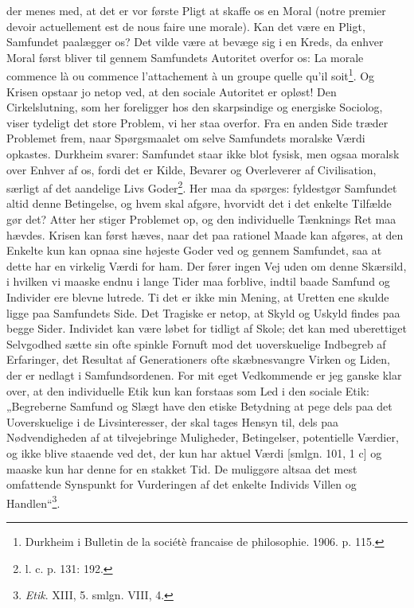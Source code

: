 \documentclass[12pt,a4paper]{book}
\newcommand{\apage}[1]{\marginnote{\footnotesize\textit{[#1]}}}
\begin{document}
der menes med, at det er vor første Pligt at skaffe os en Moral (notre premier devoir
actuellement est de nous faire une morale). Kan det være en Pligt, Samfundet paalægger os?
Det vilde være at bevæge sig i en Kreds, da enhver Moral først bliver til gennem Samfundets
Autoritet overfor os: La morale commence là ou commence l'attachement à un groupe quelle
qu'il soit\footnote{Durkheim i Bulletin de la sociétè francaise de philosophie. 1906. p.
115.}. Og Krisen opstaar jo netop ved, at den sociale Autoritet er opløst! Den
Cirkelslutning, som her foreligger hos den skarpsindige og energiske Sociolog, viser
tydeligt det store Problem, vi her staa overfor. Fra en anden Side træder Problemet frem,
naar Spørgsmaalet om selve Samfundets moralske Værdi opkastes. Durkheim svarer: Samfundet
staar ikke blot fysisk, men ogsaa moralsk over Enhver af os, fordi det er Kilde, Bevarer og
Overleverer af Civilisation, særligt af det aandelige Livs Goder\footnote{l. c. p. 131:
192.}. Her maa da spørges: fyldestgør Samfundet altid denne Betingelse, og hvem skal
afgøre, hvorvidt det i det enkelte Tilfælde gør det? Atter her stiger Problemet op, og den
individuelle Tænknings Ret maa hævdes. Krisen kan først hæves, naar det paa rationel Maade
kan afgøres, at den Enkelte kun kan opnaa sine højeste Goder ved og gennem Samfundet, saa
at dette har en virkelig Værdi for ham. Der fører ingen Vej uden om denne Skærsild, i
hvilken vi maaske endnu i lange Tider maa forblive, indtil baade Samfund og Individer ere
blevne lutrede. Ti det er ikke min Mening, at Uretten ene skulde ligge paa Samfundets Side.
Det Tragiske er netop, at Skyld og Uskyld findes paa begge Sider. Individet kan være løbet
for tidligt af Skole; det kan med uberettiget Selvgodhed sætte sin ofte spinkle Fornuft mod
det uoverskuelige Indbegreb af Erfaringer, det Resultat af Generationers ofte skæbnesvangre
Virken og Liden, der er nedlagt i Samfundsordenen. \apage{356} For mit eget Vedkommende er jeg ganske
klar over, at den individuelle Etik kun kan forstaas som Led i den sociale Etik:
„Begreberne Samfund og Slægt have den etiske Betydning at pege dels paa det Uoverskuelige i
de Livsinteresser, der skal tages Hensyn til, dels paa Nødvendigheden af at tilvejebringe
Muligheder, Betingelser, potentielle Værdier, og ikke blive staaende ved det, der kun har
aktuel Værdi [smlgn. 101, 1 c] og maaske kun har denne for en stakket Tid. De muliggøre
altsaa det mest omfattende Synspunkt for Vurderingen af det enkelte Individs Villen og
Handlen“\footnote{\emph{Etik}. XIII, 5. smlgn. VIII, 4.}.
\end{document}
